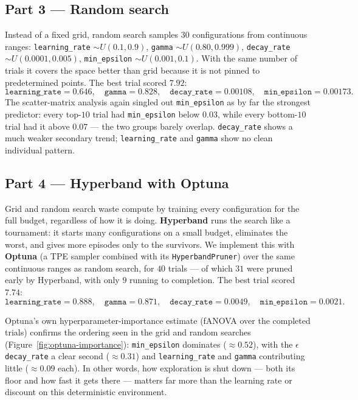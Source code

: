 \documentclass[11pt]{article}
\begin{document}
\subsection{Part 3 --- Random search}
Instead of a fixed grid, random search samples $30$ configurations from continuous ranges:
\texttt{learning\_rate} $\sim U(0.1, 0.9)$, \texttt{gamma} $\sim U(0.80, 0.999)$,
\texttt{decay\_rate} $\sim U(0.0001, 0.005)$, \texttt{min\_epsilon} $\sim U(0.001, 0.1)$. With
the same number of trials it covers the space better than grid because it is not pinned to
predetermined points. The best trial scored $7.92$:
\[
  \texttt{learning\_rate}=0.646,\quad \texttt{gamma}=0.828,\quad
  \texttt{decay\_rate}=0.00108,\quad \texttt{min\_epsilon}=0.00173 .
\]
The scatter-matrix analysis again singled out \texttt{min\_epsilon} as by far the strongest
predictor: every top-$10$ trial had \texttt{min\_epsilon} below $0.03$, while every bottom-$10$
trial had it above $0.07$ --- the two groups barely overlap. \texttt{decay\_rate} shows a much
weaker secondary trend; \texttt{learning\_rate} and \texttt{gamma} show no clean individual
pattern.

\subsection{Part 4 --- Hyperband with Optuna}
Grid and random search waste compute by training every configuration for the full budget,
regardless of how it is doing. \textbf{Hyperband} runs the search like a tournament: it starts
many configurations on a small budget, eliminates the worst, and gives more episodes only to
the survivors. We implement this with \textbf{Optuna} (a TPE sampler combined with its
\texttt{HyperbandPruner}) over the same continuous ranges as random search, for $40$ trials ---
of which $31$ were pruned early by Hyperband, with only $9$ running to completion.
The best trial scored $7.74$:
\[
  \texttt{learning\_rate}=0.888,\quad \texttt{gamma}=0.871,\quad
  \texttt{decay\_rate}=0.0049,\quad \texttt{min\_epsilon}=0.0021 .
\]

Optuna's own hyperparameter-importance estimate (fANOVA over the completed trials)
confirms the ordering seen in the grid and random searches (Figure~\ref{fig:optuna-importance}):
\texttt{min\_epsilon} dominates ($\approx 0.52$), with the $\epsilon$ \texttt{decay\_rate} a clear
second ($\approx 0.31$) and \texttt{learning\_rate} and \texttt{gamma} contributing little
($\approx 0.09$ each). In other words, how exploration is shut down --- both its floor and how
fast it gets there --- matters far more than the learning rate or discount on this deterministic
environment.
\end{document}
